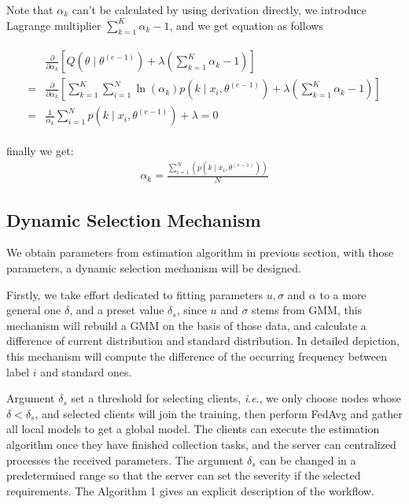 \documentclass[conference]{IEEEtran}
\begin{document}
Note that $\alpha_k$ can't be calculated by using derivation directly, we introduce Lagrange multiplier $\sum_{k=1}^{K} \alpha_k -1$,
and we get equation as follows
\begin{small}
\begin{align}
  \begin{aligned}
    & \frac{\partial}{\partial \alpha_{k}}\left[Q\left(\theta \mid \theta^{(e-1)}\right)+\lambda\left(\sum_{k=1}^{K} \alpha_{k}-1\right)\right]  \\
    =& \frac{\partial}{\partial \alpha_{k}}\left[\sum_{k=1}^{K} \sum_{i=1}^{N} \ln \left(\alpha_{k}\right) p\left(k \mid x_{i}, \theta^{(e-1)}\right)+\lambda\left(\sum_{k=1}^{K} \alpha_{k}-1\right)\right]   \\
    =& \frac{1}{\alpha_{k}} \sum_{i=1}^{N} p\left(k \mid x_{i}, \theta^{(e-1)}\right)+\lambda=0
  \end{aligned}
\end{align}
\end{small}
finally we get:
\begin{align}
  \alpha_{k}=\frac{\sum_{i=1}^{N}\left(p\left(k \mid x_{i}, \theta^{(e-1)}\right)\right)}{N}
\end{align}
\subsection{Dynamic Selection Mechanism}
We obtain parameters from estimation algorithm in previous section,
with those parameters, a dynamic selection mechanism will be designed. 

Firstly, we take effort dedicated to fitting parameters $u, \sigma$ and $\alpha$
to a more general one $\delta $, and a preset value $\delta_s$, since $u$ and $\sigma $
stems from GMM, this mechanism will rebuild a GMM on the basis of 
those data, and calculate a difference of current distribution and 
standard distribution. In detailed depiction, this mechanism will compute
 the difference of the occurring frequency between label $i$ and standard ones.

Argument $\delta_s$ set a threshold for selecting clients, \textit{i}.\textit{e}.,
we only choose nodes whose $\delta < \delta_s$, and selected clients will join the training,
then perform FedAvg and gather all local models to get a global model. The clients can 
execute the estimation algorithm once they have finished collection tasks, 
and the server can centralized processes the received parameters.  
The argument $\delta_s$ can be changed in a predetermined range so that the server can set 
the severity if the selected requirements. The Algorithm 1 gives an explicit description of the workflow.
\end{document}
